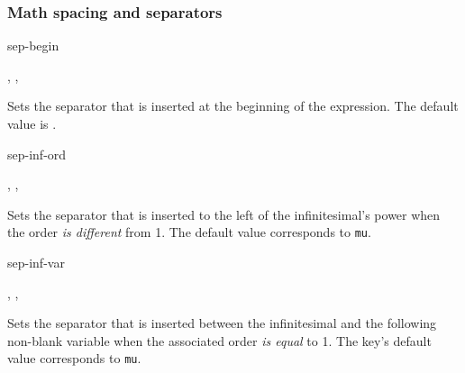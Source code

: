 \subsubsection*{Math spacing and separators}

\begin{option}{sep-begin}
	\begin{values}[default = \cs{mathop}\{\}\cs{!}]
		, , 
	\end{values}
	Sets the separator that is inserted at the beginning of the expression. The default value is .
	\begin{example}
	\end{example}
\end{option}

\begin{option}{sep-inf-ord}
	\begin{values}[default = 0]
		, , \marg{delimiter}
	\end{values}
	Sets the separator that is inserted to the left of the infinitesimal's power when the order \emph{is different} from \num{1}. The default value corresponds to  \texttt{mu}.
	\begin{example}
		\odif[sep-inf-ord=\here, order=2]{x,y}
	\end{example}
\end{option}

\begin{option}{sep-inf-var}
	\begin{values}[default = 0]
		, , 
	\end{values}
	Sets the separator that is inserted between the infinitesimal and the following non-blank variable when the associated order \emph{is equal} to \num{1}. The key's default value corresponds to  \texttt{mu}.
	\begin{example}
		\odif[sep-inf-var=\here, order=2]{x,y}
	\end{example}
\end{option}

